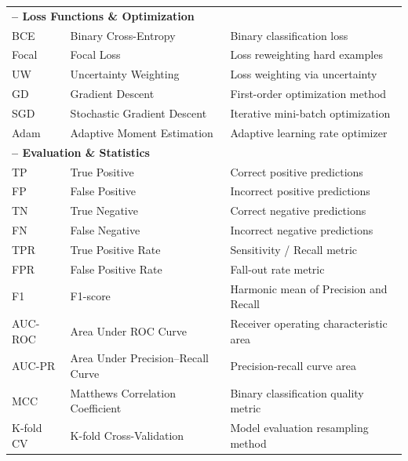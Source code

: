 \begin{longtable}{@{}p{2cm} p{5.5cm} p{5cm}@{}}
\multicolumn{3}{l}{\textbf{– Loss Functions \& Optimization}}\\
BCE      & Binary Cross-Entropy                     & Binary classification loss \\
Focal    & Focal Loss                               & Loss reweighting hard examples \\
UW       & Uncertainty Weighting                    & Loss weighting via uncertainty \\
GD       & Gradient Descent                         & First-order optimization method \\
SGD      & Stochastic Gradient Descent              & Iterative mini-batch optimization \\
Adam     & Adaptive Moment Estimation               & Adaptive learning rate optimizer \\[3pt]

\multicolumn{3}{l}{\textbf{– Evaluation \& Statistics}}\\
TP       & True Positive                            & Correct positive predictions \\
FP       & False Positive                            & Incorrect positive predictions \\
TN       & True Negative                            & Correct negative predictions \\
FN       & False Negative                           & Incorrect negative predictions \\
TPR      & True Positive Rate                       & Sensitivity / Recall metric \\
FPR      & False Positive Rate                      & Fall-out rate metric \\
F1       & F1-score                                 & Harmonic mean of Precision and Recall \\
AUC-ROC  & Area Under ROC Curve                     & Receiver operating characteristic area \\
AUC-PR   & Area Under Precision–Recall Curve        & Precision-recall curve area \\
MCC      & Matthews Correlation Coefficient         & Binary classification quality metric \\
K-fold CV & K-fold Cross-Validation                  & Model evaluation resampling method \\[3pt]


\end{longtable}
